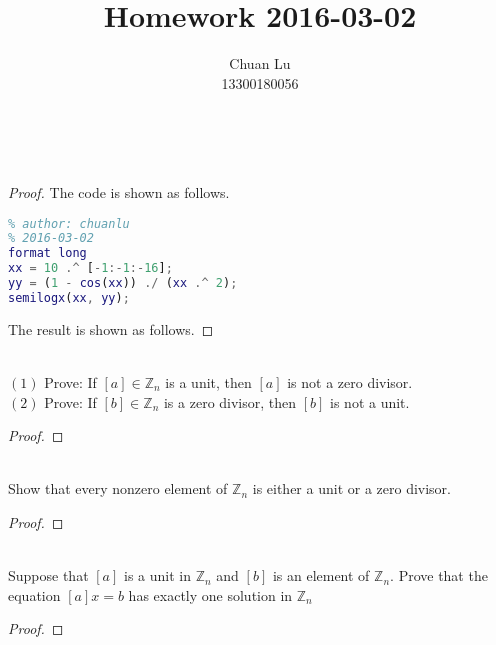 \documentclass[12pt]{article}
\newcommand{\Z}{\mathbb{Z}}
\newenvironment{problem}[2][Problem]{\begin{trivlist}
\item[\hskip \labelsep {\bfseries #1}\hskip \labelsep {\bfseries #2.}]}{\end{trivlist}}
\begin{document}
 
\title{Homework 2016-03-02}
\author{Chuan Lu\\ 
13300180056}
 
\maketitle
 
\begin{problem}{1}
\text{ }\\
\end{problem}
 
\begin{proof}
The code is shown as follows.

\begin{lstlisting}[language={MATLAB}]
% homework1
% author: chuanlu
% 2016-03-02
format long
xx = 10 .^ [-1:-1:-16];
yy = (1 - cos(xx)) ./ (xx .^ 2);
semilogx(xx, yy);    
\end{lstlisting}

The result is shown as follows.
\end{proof}

 
\begin{problem}{2}
\text{ }\\
$(1)$ Prove: If $[a] \in \Z_{n}$ is a unit, then $[a]$ is not a zero divisor.\\
$(2)$ Prove: If $[b] \in \Z_{n}$ is a zero divisor, then $[b]$ is not a unit.
\end{problem}
 
\begin{proof}

\end{proof}

\begin{problem}{3}
\text{ }\\
Show that every nonzero element of $\Z_{n}$ is either a unit or a zero divisor.
\end{problem}
 
\begin{proof}

\end{proof}

\begin{problem}{4}
\text{ }\\
Suppose that $[a]$ is a unit in $\Z_{n}$ and $[b]$ is an element of $\Z_{n}$. Prove that the equation $[a]x = b$ has exactly one solution in $\Z_{n}$
\end{problem}
 
\begin{proof}

\end{proof}
\end{document}
